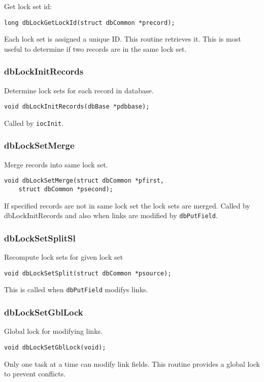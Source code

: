 Get lock set id:

\begin{verbatim}long dbLockGetLockId(struct dbCommon *precord);
\end{verbatim}Each lock set is assigned a unique ID. This routine retrieves it. This is most useful to determine if two records are in the 
same lock set.

\subsubsection{dbLockInitRecords}

Determine lock sets for each record in database.

\begin{verbatim}void dbLockInitRecords(dbBase *pdbbase);
\end{verbatim}Called by \verb|iocInit|.

\subsubsection{dbLockSetMerge}

Merge records into same lock set.

\begin{verbatim}void dbLockSetMerge(struct dbCommon *pfirst,
    struct dbCommon *psecond);
\end{verbatim}If specified records are not in same lock set the lock sets are merged. Called by dbLockInitRecords and also when links 
are modified by \verb|dbPutField|.

\subsubsection{dbLockSetSplitSl}

Recompute lock sets for given lock set

\begin{verbatim}void dbLockSetSplit(struct dbCommon *psource);
\end{verbatim}This is called when \verb|dbPutField| modifys links.

\subsubsection{dbLockSetGblLock}

Global lock for modifying links.

\begin{verbatim}void dbLockSetGblLock(void);
\end{verbatim}Only one task at a time can modify link fields. This routine provides a global lock to prevent conflicts.

